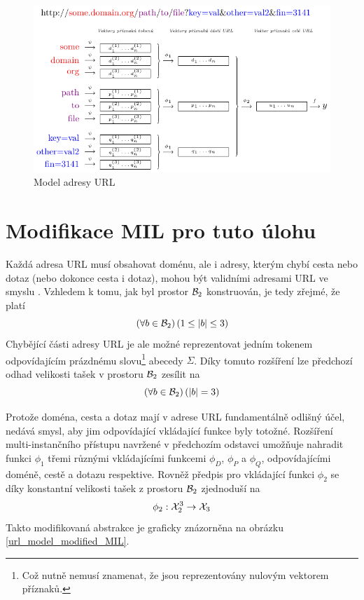 \begin{figure}[h]
	\centering
	\includegraphics{images/model_MIL/model_MIL.pdf}
	\caption{Model adresy URL}\label{url_model_MIL}
\end{figure}

\section{Modifikace MIL pro tuto úlohu}\label{MIL-modification}
Každá adresa URL musí obsahovat doménu, ale i adresy, kterým chybí cesta nebo dotaz (nebo dokonce cesta i dotaz), mohou být validními adresami URL ve smyslu \cite{berners-lee_uniform_1994}. Vzhledem k tomu, jak byl prostor \( \mathcal B_2 \) konstruován, je tedy zřejmé, že platí
\[ \left( \forall b \in \mathcal B_2 \right) \left( 1 \leq \left| b \right| \leq 3 \right) \]
Chybějící části adresy URL je ale možné reprezentovat jedním tokenem odpovídajícím prázdnému slovu\footnote{Což nutně nemusí znamenat, že jsou reprezentovány nulovým vektorem příznaků.} abecedy \( \Sigma \). Díky tomuto rozšíření lze předchozí odhad velikosti tašek v prostoru \( \mathcal B_2 \) zesílit na
\[ \left( \forall b \in \mathcal B_2 \right) \left( \left| b \right| = 3 \right) \]

Protože doména, cesta a dotaz mají v adrese URL fundamentálně odlišný účel, nedává smysl, aby jim odpovídající vkládající funkce byly totožné. Rozšíření multi-instančního přístupu navržené v předchozím odstavci umožňuje nahradit funkci \( \phi_1 \) třemi různými vkládajícími funkcemi \( \phi_D \), \( \phi_P \) a \( \phi_Q \), odpovídajícími doméně, cestě a dotazu respektive. Rovněž předpis pro vkládající funkci \( \phi_2 \) se díky konstantní velikosti tašek z prostoru \( \mathcal B_2 \) zjednoduší na
\[ \phi_2 : \mathcal X_2^3 \to \mathcal X_3 \]
Takto modifikovaná abstrakce je graficky znázorněna na obrázku \ref{url_model_modified_MIL}.

